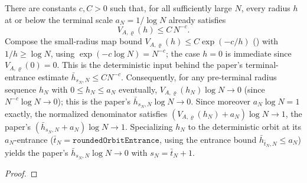 \begin{lemma}
  \label{lem:subcritical-exact-terminal-decay}
  \leanok
  There are constants $c,C>0$ such that, for all sufficiently large $N$, every radius
  $h$ at or below the terminal scale $a_N=1/\log N$ already satisfies
  \[
    V_{A,\varrho}(h)\leq C\,N^{-c}.
  \]
  Compose the small-radius map bound $V_{A,\varrho}(h)\leq C\exp(-c/h)$
  () with $1/h\geq\log N$, using
  $\exp(-c\log N)=N^{-c}$; the case $h=0$ is immediate since $V_{A,\varrho}(0)=0$.  This
  is the deterministic input behind the paper's terminal-entrance estimate
  $\bar h_{s_N,N}\leq C N^{-c}$.  Consequently, for any pre-terminal radius sequence
  $h_N$ with $0\leq h_N\leq a_N$ eventually, $V_{A,\varrho}(h_N)\log N\to0$ (since
  $N^{-c}\log N\to0$); this is the paper's $\bar h_{s_N,N}\log N\to0$.  Since moreover
  $a_N\log N=1$ exactly, the normalized denominator satisfies
  $(V_{A,\varrho}(h_N)+a_N)\log N\to1$, the paper's $(\bar h_{s_N,N}+a_N)\log N\to1$.
  Specializing $h_N$ to the deterministic orbit at its $a_N$-entrance
  ($\bar t_N=\texttt{roundedOrbitEntrance}$, using the entrance bound
  $\bar h_{\bar t_N,N}\leq a_N$) yields the paper's $\bar h_{s_N,N}\log N\to0$ with
  $s_N=\bar t_N+1$.
\end{lemma}
\begin{proof}\leanok{}\end{proof}

